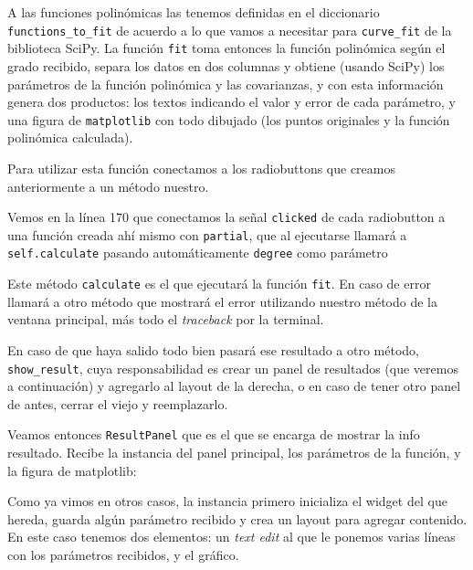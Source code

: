 
A las funciones polinómicas las tenemos definidas en el diccionario \texttt{functions\_to\_fit} de acuerdo a lo que vamos a necesitar para \texttt{curve\_fit} de la biblioteca SciPy. La función \texttt{fit} toma entonces la función polinómica según el grado recibido, separa los datos en dos columnas y obtiene (usando SciPy) los parámetros de la función polinómica y las covarianzas, y con esta información genera dos productos: los textos indicando el valor y error de cada parámetro, y una figura de \texttt{matplotlib} con todo dibujado (los puntos originales y la función polinómica calculada).

Para utilizar esta función conectamos a los radiobuttons que creamos anteriormente a un método nuestro.


Vemos en la línea 170 que conectamos la señal \texttt{clicked} de cada radiobutton a una función creada ahí mismo con \texttt{partial}, que al ejecutarse llamará a \texttt{self.calculate} pasando automáticamente \texttt{degree} como parámetro


Este método \texttt{calculate} es el que ejecutará la función \texttt{fit}. En caso de error llamará a otro método que mostrará el error utilizando nuestro método de la ventana principal, más todo el \textit{traceback} por la terminal.

En caso de que haya salido todo bien pasará ese resultado a otro método, \texttt{show\_result}, cuya responsabilidad es crear un panel de resultados (que veremos a continuación) y agregarlo al layout de la derecha, o en caso de tener otro panel de antes, cerrar el viejo y reemplazarlo.

Veamos entonces \texttt{ResultPanel} que es el que se encarga de mostrar la info resultado. Recibe la instancia del panel principal, los parámetros de la función, y la figura de matplotlib:


Como ya vimos en otros casos, la instancia primero inicializa el widget del que hereda, guarda algún parámetro recibido y crea un layout para agregar contenido. En este caso tenemos dos elementos: un \textit{text edit} al que le ponemos varias líneas con los parámetros recibidos, y el gráfico.

